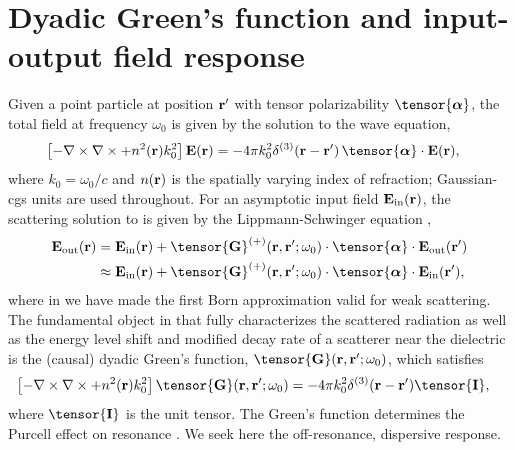 \documentclass[preprint,aps,pra,onecolumn]{revtex4-1} %
\newcommand{\inp}{{\rm in}}
\newcommand{\out}{{\rm out}}
\newcommand{\unittens}{\tensor{\mathbf{I}}}
\begin{document}
\section{Dyadic Green's function and input-output field response}

Given a point particle at position $\mathbf{r}'$ with tensor polarizability $\tensor{\boldsymbol{\alpha}}$, the total field  at frequency $\omega_0$ is given by the solution to the wave equation, 
	\begin{align}\label{Eq::WaveEquationSource}
		\left[ - \nabla \times\nabla \times + n^2(\br)k_0^2 \right] \mathbf{E}(\br) &= -4\pi  k_0^2 \delta^{(3)}(\br-\br')\,  \tensor{\boldsymbol{\alpha}}\cdot \mathbf{E}(\br),
	\end{align}
where $k_0=\omega_0/c$ and $n(\mathbf{r})$ is the spatially varying index of refraction; Gaussian-cgs units are used throughout.  For an asymptotic input field $\mathbf{E}_{\inp}(\br)$, the scattering solution to  is given by the Lippmann-Schwinger equation \cite{wubs_multiple-scattering_2004},
	\begin{align}
		\mathbf{E}_{\out}(\br) &=\mathbf{E}_{\inp}(\br)+\tensor{\mathbf{G}}^{(+)}(\br , \br'; \omega_0)\cdot 
\tensor{\boldsymbol{\alpha}}\cdot \mathbf{E}_{\out}(\br')\\
		&\approx \mathbf{E}_{\inp}(\br)+ \tensor{\mathbf{G}}^{(+)}(\br , \br'; \omega_0) \cdot 
\tensor{\boldsymbol{\alpha}}\cdot \mathbf{E}_{\inp}(\br'), \label{Eq::ScatteredField}
	\end{align}
where in  we have made the first Born approximation valid for weak scattering. The fundamental object in that fully characterizes the scattered radiation as well as the energy level shift and modified decay rate of a scatterer near the dielectric is the (causal) dyadic Green's function, $\tensor{\mathbf{G}}(\br, \br';\omega_0)$, which satisfies
	\begin{align} \label{Eq::GreensDiffEq}
		\left[ -\nabla\times\nabla\times + n^2(\mbf{r}) k_0^2 \right] \tensor{\mathbf{G}}(\br, \br';\omega_0) &= -4\pi 
k_0^2 \delta^{(3)}(\mathbf{r}-\mathbf{r}') \unittens,
	\end{align}
where $\unittens$ is the unit tensor.  The Green's function determines the Purcell effect on resonance \cite{}.  We seek here the off-resonance, dispersive response.  
\end{document}
